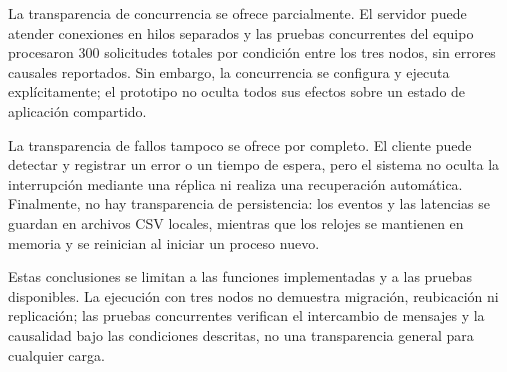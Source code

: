 La transparencia de concurrencia se ofrece parcialmente. El servidor puede atender conexiones en hilos separados y las pruebas concurrentes del equipo procesaron 300 solicitudes totales por condición entre los tres nodos, sin errores causales reportados. Sin embargo, la concurrencia se configura y ejecuta explícitamente; el prototipo no oculta todos sus efectos sobre un estado de aplicación compartido.

La transparencia de fallos tampoco se ofrece por completo. El cliente puede detectar y registrar un error o un tiempo de espera, pero el sistema no oculta la interrupción mediante una réplica ni realiza una recuperación automática. Finalmente, no hay transparencia de persistencia: los eventos y las latencias se guardan en archivos CSV locales, mientras que los relojes se mantienen en memoria y se reinician al iniciar un proceso nuevo.

Estas conclusiones se limitan a las funciones implementadas y a las pruebas disponibles. La ejecución con tres nodos no demuestra migración, reubicación ni replicación; las pruebas concurrentes verifican el intercambio de mensajes y la causalidad bajo las condiciones descritas, no una transparencia general para cualquier carga.
